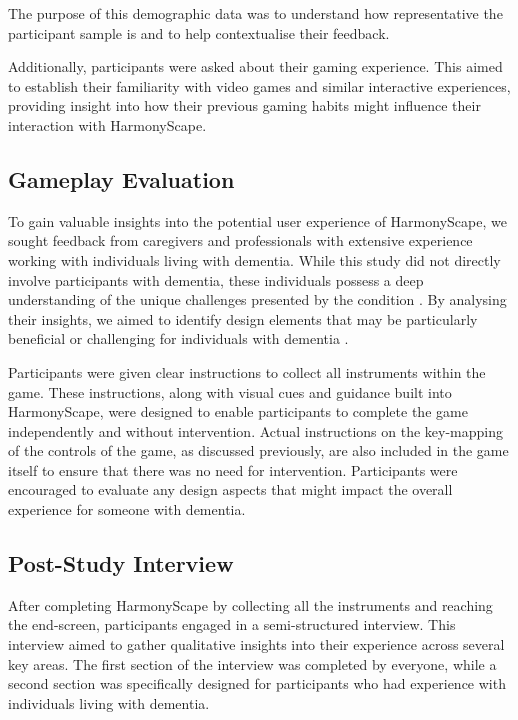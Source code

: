 \documentclass{l4proj}
\begin{document}
The purpose of this demographic data was to understand how representative the participant sample is and to help contextualise their feedback.

Additionally, participants were asked about their gaming experience. This aimed to establish their familiarity with video games and similar interactive experiences, providing insight into how their previous gaming habits might influence their interaction with HarmonyScape.

\subsection{Gameplay Evaluation}

To gain valuable insights into the potential user experience of HarmonyScape, we sought feedback from caregivers and professionals with extensive experience working with individuals living with dementia. While this study did not directly involve participants with dementia, these individuals possess a deep understanding of the unique challenges presented by the condition \citep{papachristou_involving_2018}. By analysing their insights, we aimed to identify design elements that may be particularly beneficial or challenging for individuals with dementia \citep{papachristou_involving_2018}.

Participants were given clear instructions to collect all instruments within the game. These instructions, along with visual cues and guidance built into HarmonyScape, were designed to enable participants to complete the game independently and without intervention. Actual instructions on the key-mapping of the controls of the game, as discussed previously, are also included in the game itself to ensure that there was no need for intervention. Participants were encouraged to evaluate any design aspects that might impact the overall experience for someone with dementia.

\subsection{Post-Study Interview}
After completing HarmonyScape by collecting all the instruments and reaching the end-screen, participants engaged in a semi-structured interview. This interview aimed to gather qualitative insights into their experience across several key areas.  The first section of the interview was completed by everyone, while a second section was specifically designed for participants who had experience with individuals living with dementia.
\end{document}

